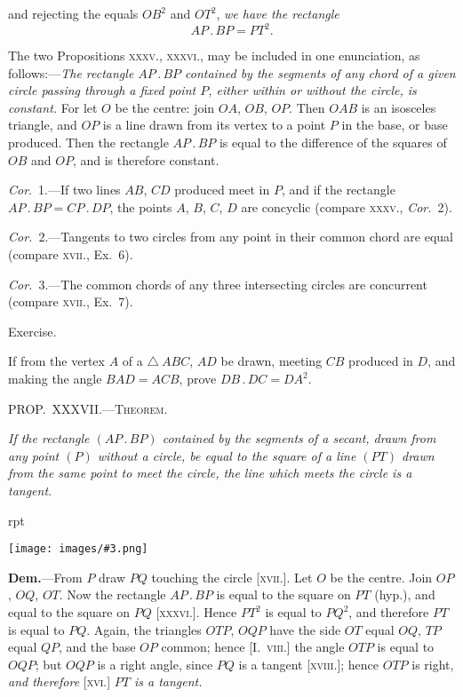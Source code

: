 \documentclass[oneside]{book}
\newcounter{wrapwidth}
\newcommand\mypropl[2]{
\bigskip\Needspace*{4\baselineskip}\begin{center}\textsc{#1}\end{center}
\hspace{\parindent}\emph{#2}\par\medskip
}
\newcommand\exhead[1]{
\Needspace*{5\baselineskip}\begin{center}
\textsf{#1}
\end{center}
}
\newcommand\imgflow[3]{
\setcounter{wrapwidth}{#1}
\begin{wrapfigure}[#2]{r}{\value{wrapwidth}pt}
\begin{center}
\vspace{-0.3in}
\texttt{[image: images/\#3.png]}
\end{center}
\end{wrapfigure}
}
\begin{document}
\noindent and rejecting the equals $OB^2$ and $OT^2$, \emph{we have the
rectangle}
\[
AP\,.\,BP = PT^2.
\]

\begin{footnotesize}
The two Propositions \textsc{xxxv., xxxvi.}, may be included in one
enunciation, as follows:---\emph{The rectangle $AP\,.\,BP$ contained by the
segments of any chord of a given circle passing through a fixed point
$P$, either within or without the circle, is constant.} For let $O$ be
the centre: join $OA$, $OB$, $OP$. Then $OAB$ is an isosceles triangle,
and $OP$ is a line drawn from its vertex to a point $P$ in the base,
or base produced. Then the rectangle $AP\,.\,BP$ is equal to the
difference of the squares of $OB$ and $OP$, and is therefore constant.
\par\end{footnotesize}

\emph{Cor}.~1.---If two lines $AB$, $CD$ produced meet in $P$,
and if the rectangle $AP\,.\,BP = CP\,.\,DP$, the points
$A$, $B$, $C$, $D$ are concyclic\label{concylic3} (compare \textsc{xxxv}., \emph{Cor.}~2).

\emph{Cor.}~2.---Tangents to two circles from any point in
their common chord are equal (compare \textsc{xvii}., Ex.~6).

\emph{Cor.}~3.---The common chords of any three intersecting
circles are concurrent (compare \textsc{xvii.}, Ex.~7).

\exhead{Exercise.}

\begin{footnotesize}
If from the vertex $A$ of a $\triangle\ ABC$, $AD$ be drawn, meeting
$CB$ produced in $D$, and making the angle $BAD = ACB$, prove
$DB\,.\,DC = DA^2$.
\par\end{footnotesize}

\mypropl{PROP\@.~XXXVII\@.---Theorem.}{If the rectangle $(AP\,.\,BP)$ contained by the segments of
a secant, drawn from any point $(P)$ without a circle, be
equal to the square of a line $(PT)$ drawn from the same
point to meet the circle, the line which meets the circle is
a tangent.}

\imgflow{175}{10}{f150}

\textbf{Dem.}---From $P$ draw $PQ$ touching the circle [\textsc{xvii.}].
Let $O$ be the centre.
Join $OP$, $OQ$, $OT$.
Now the rectangle
$AP\,.\,BP$ is equal to the
square on $PT$ (hyp.),
and equal to the square
on $PQ$ [\textsc{xxxvi.}]. Hence
$PT^2$ is equal to $PQ^2$,
and therefore $PT$ is
equal to $PQ$. Again,
the triangles $OTP$, $OQP$ have the side $OT$ equal $OQ$,
$TP$ equal $QP$, and the base $OP$ common; hence [I.~\textsc{viii.}]
the angle $OTP$ is equal to $OQP$; but $OQP$ is a right
angle, since $PQ$ is a tangent [\textsc{xviii.}]; hence $OTP$ is
right, \emph{and therefore} [\textsc{xvi.}] \emph{$PT$ is a tangent.}
\end{document}
